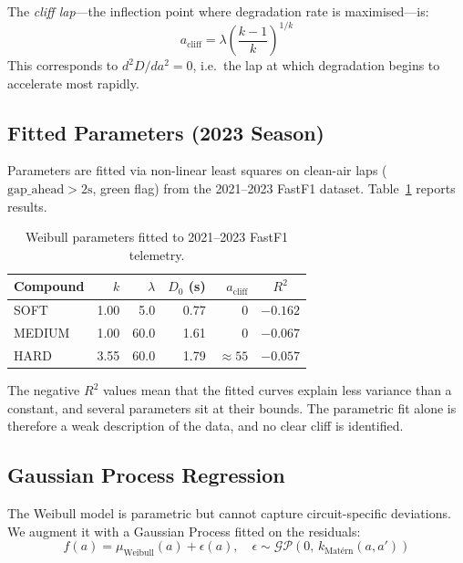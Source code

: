 \documentclass[11pt, a4paper, twocolumn]{article}
\numberwithin{equation}{section}
\theoremstyle{definition}
\newcommand{\age}{a}
\begin{document}
The \emph{cliff lap}---the inflection point where degradation rate is
maximised---is:
\begin{equation}
  \age_{\text{cliff}} = \lambda \left(\frac{k-1}{k}\right)^{1/k}
  \label{eq:cliff}
\end{equation}
This corresponds to $d^2D/d\age^2 = 0$, i.e.\ the lap at which degradation
begins to accelerate most rapidly.

\subsection{Fitted Parameters (2023 Season)}

Parameters are fitted via non-linear least squares on clean-air laps
($\text{gap\_ahead} > 2\text{s}$, green flag) from the 2021--2023 FastF1
dataset. Table~\ref{tab:weibull} reports results.

\begin{table}[!h]
  \centering
  \small
  \caption{Weibull parameters fitted to 2021--2023 FastF1 telemetry.}
  \label{tab:weibull}
  \setlength{\tabcolsep}{5pt}
  \begin{tabular}{@{}lrrrrc@{}}
    \toprule
    Compound & $k$ & $\lambda$ & $D_0$ (s) & $\age_{\text{cliff}}$ & $R^2$ \\
    \midrule
    \rowcolor{rowalt}
    SOFT   & 1.00 & 5.0 & 0.77 & $0$ & $-0.162$ \\
    MEDIUM & 1.00 & 60.0 & 1.61 & $0$ & $-0.067$ \\
    \rowcolor{rowalt}
    HARD   & 3.55 & 60.0 & 1.79 & $\approx 55$ & $-0.057$ \\
    \bottomrule
  \end{tabular}
\end{table}

The negative $R^2$ values mean that the fitted curves explain less variance than
a constant, and several parameters sit at their bounds. The parametric fit alone
is therefore a weak description of the data, and no clear cliff is identified.

\subsection{Gaussian Process Regression}

The Weibull model is parametric but cannot capture circuit-specific deviations.
We augment it with a Gaussian Process fitted on the residuals:
\begin{equation}
  f(\age) = \mu_{\text{Weibull}}(\age) + \epsilon(\age), \quad
  \epsilon \sim \mathcal{GP}\!\left(0,\, k_{\text{Mat\'{e}rn}}(\age, \age')\right)
\end{equation}
\end{document}
